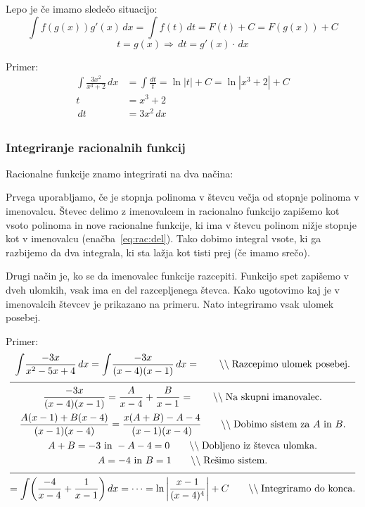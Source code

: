\documentclass[a4paper,oneside,12pt,fleqn]{article}
\newcommand\krat\cdot
\newcommand{\comment}[1]{\ensuremath{\qquad\backslash\backslash\;}\textnormal{#1}}
\renewcommand{\d}{\ensuremath{\,d}} %
\newcommand{\dx}{\ensuremath{\d x}}
\newcommand{\dt}{\ensuremath{\d t}}
\renewcommand\implies\Rightarrow
\numberwithin{equation}{section}
\begin{document}
Lepo je če imamo sledečo situacijo:
\[ \int\!f(g(x))g'(x)\dx = \int\!f(t)\dt = F(t)+C = F(g(x)) + C \]
\[ t = g(x) \implies \dt = g'(x) \krat \dx \]

Primer:\\
\begin{align*}
  \int\!\frac{3x^2}{x^3+2}\dx &= \int\!\frac{dt}{t} = \ln|t| + C = \ln|x^3+2| + C \\
  t &= x^3+2 \\
  \dt &= 3x^2 \dx \\
\end{align*}

\subsubsection{Integriranje racionalnih funkcij}
\label{sec:int:rac}
Racionalne funkcije znamo integrirati na dva načina:

Prvega uporabljamo, če je stopnja polinoma v števcu večja od stopnje polinoma v
imenovalcu. Števec delimo z imenovalcem in racionalno funkcijo zapišemo kot 
vsoto polinoma in nove racionalne funkcije, ki ima v števcu polinom nižje stopnje kot v
imenovalcu (enačba~\eqref{eq:rac:del}). Tako dobimo integral vsote, ki ga razbijemo da dva
integrala, ki sta lažja kot tisti prej (če imamo srečo).

Drugi način je, ko se da imenovalec funkcije razcepiti. Funkcijo spet zapišemo v dveh
ulomkih, vsak ima en del razcepljenega števca. Kako ugotovimo kaj je v imenovalcih števcev
je prikazano na primeru. Nato integriramo vsak ulomek posebej.

Primer:
\begin{gather*}
  \int\!\frac{-3x}{x^2-5x+4}\dx = \int\!\frac{-3x}{(x-4)(x-1)}\dx = \comment{Razcepimo
  ulomek posebej.} \\[6pt] \hline \\[-12pt]
  \frac{-3x}{(x-4)(x-1)} = \frac{A}{x-4} + \frac{B}{x-1} = \comment{Na skupni imanovalec.}  \\
  \frac{A(x-1)+B(x-4)}{(x-1)(x-4)} = \frac{x(A+B) - A - 4}{(x-1)(x-4)} \comment{Dobimo
  sistem za $A$ in $B$.} \\
  A + B = -3 \text{ in } -A - 4 = 0 \comment{Dobljeno iz števca ulomka.} \\
  A = -4 \text{ in } B = 1 \comment{Rešimo sistem.} \\[6pt] \hline \\[-12pt]
  = \int\!\left(\frac{-4}{x-4}+\frac{1}{x-1}\right)\!\dx = \cdots =
  \ln\left|\frac{x-1}{(x-4)^4}\right|+C \comment{Integriramo do konca.}
\end{gather*}
\end{document}
